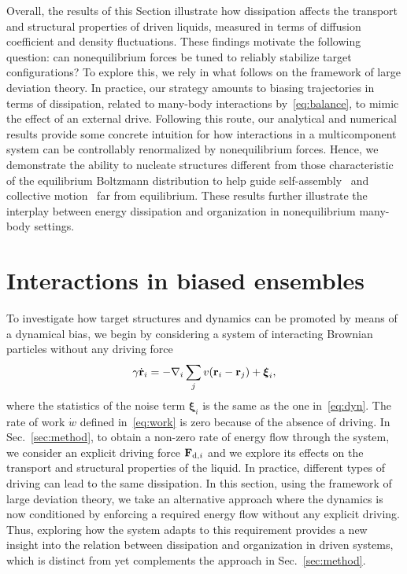 \documentclass[superscriptaddress, twocolumn, prx, longbibliography, nofootinbib]{revtex4-1}
\begin{document}
Overall, the results of this Section illustrate how dissipation affects the transport and structural properties of driven liquids, measured in terms of diffusion coefficient and density fluctuations. These findings motivate the following question: can nonequilibrium forces be tuned to reliably stabilize target configurations? To explore this, we rely in what follows on the framework of large deviation theory. In practice, our strategy amounts to biasing trajectories in terms of dissipation, related to many-body interactions by~\eqref{eq:balance}, to mimic the effect of an external drive. Following this route, our analytical and numerical results provide some concrete intuition for how interactions in a multicomponent system can be controllably renormalized by nonequilibrium forces. Hence, we demonstrate the ability to nucleate structures different from those characteristic of the equilibrium Boltzmann distribution to help guide self-assembly~\cite{Bisker2018} and collective motion~\cite{Vicsek1995} far from equilibrium. These results further illustrate the interplay between energy dissipation and organization in nonequilibrium many-body settings.





\section{Interactions in biased ensembles}\label{sec:bias}

To investigate how target structures and dynamics can be promoted by means of a dynamical bias, we begin by considering a system of interacting Brownian particles without any driving force
\begin{equation}\label{eq:dyn_eq}
	\gamma\dot{\bf r}_i = - \nabla_i \sum_j v({\bf r}_i-{\bf r}_j) + {\boldsymbol\xi}_i ,
\end{equation}
where the statistics of the noise term ${\boldsymbol\xi}_i$ is the same as the one in~\eqref{eq:dyn}. The rate of work $\dot w$ defined in~\eqref{eq:work} is zero because of the absence of driving. In Sec.~\ref{sec:method}, to obtain a non-zero rate of energy flow through the system, we consider an explicit driving force ${\bf F}_{{\rm d},i}$ and we explore its effects on the transport and structural properties of the liquid. In practice, different types of driving can lead to the same dissipation. In this section, using the framework of 
large deviation theory, 
we take an alternative approach where the dynamics is now conditioned by enforcing a required energy flow without any explicit driving. Thus, exploring how the system adapts to this requirement provides a new insight into the relation between dissipation and organization in driven systems, which is distinct from yet complements the approach in Sec.~\ref{sec:method}.
\end{document}
